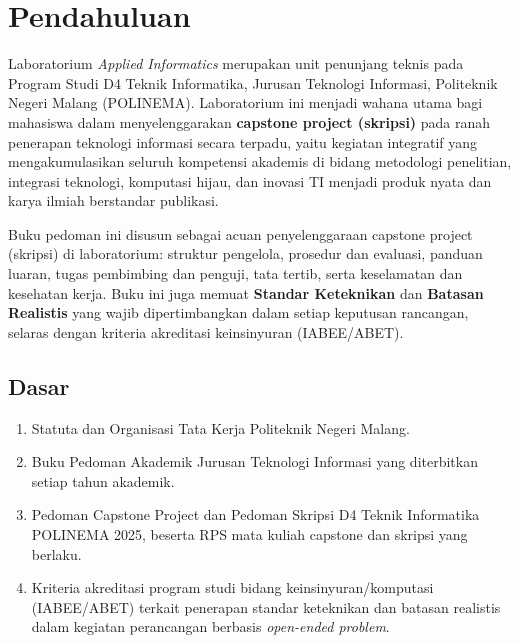 \documentclass[12pt,a4paper]{report}
\begin{document}
\PedomanCover

\clearpage
\tableofcontents

\clearpage
{}

\chapter{Pendahuluan}

Laboratorium \emph{Applied Informatics} merupakan unit penunjang teknis pada Program Studi D4 Teknik Informatika, Jurusan Teknologi Informasi, Politeknik Negeri Malang (POLINEMA). Laboratorium ini menjadi wahana utama bagi mahasiswa dalam menyelenggarakan \textbf{capstone project (skripsi)} pada ranah penerapan teknologi informasi secara terpadu, yaitu kegiatan integratif yang mengakumulasikan seluruh kompetensi akademis di bidang metodologi penelitian, integrasi teknologi, komputasi hijau, dan inovasi TI menjadi produk nyata dan karya ilmiah berstandar publikasi.

Buku pedoman ini disusun sebagai acuan penyelenggaraan capstone project (skripsi) di laboratorium: struktur pengelola, prosedur dan evaluasi, panduan luaran, tugas pembimbing dan penguji, tata tertib, serta keselamatan dan kesehatan kerja. Buku ini juga memuat \textbf{Standar Keteknikan} dan \textbf{Batasan Realistis} yang wajib dipertimbangkan dalam setiap keputusan rancangan, selaras dengan kriteria akreditasi keinsinyuran (IABEE/ABET).

\section{Dasar}
\begin{enumerate}
\item Statuta dan Organisasi Tata Kerja Politeknik Negeri Malang.
\item Buku Pedoman Akademik Jurusan Teknologi Informasi yang diterbitkan setiap tahun akademik.
\item Pedoman Capstone Project dan Pedoman Skripsi D4 Teknik Informatika POLINEMA 2025, beserta RPS mata kuliah capstone dan skripsi yang berlaku.
\item Kriteria akreditasi program studi bidang keinsinyuran/komputasi (IABEE/ABET) terkait penerapan standar keteknikan dan batasan realistis dalam kegiatan perancangan berbasis \emph{open-ended problem}.
\end{enumerate}
\end{document}
